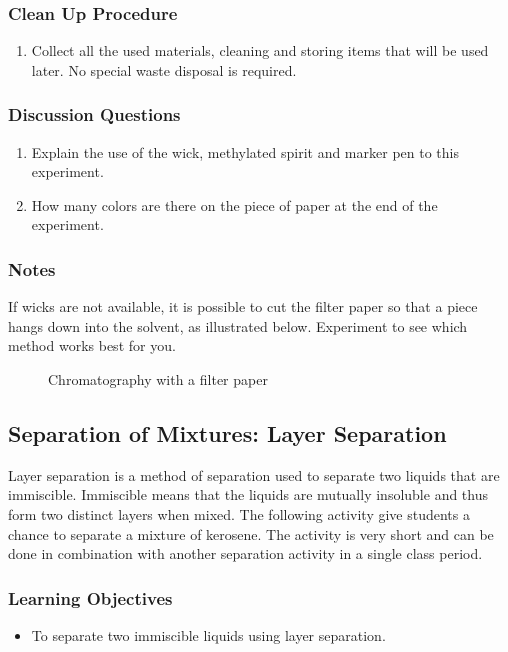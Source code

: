 \subsubsection*{Clean Up Procedure}
\begin{enumerate}
\item{Collect all the used materials, cleaning and storing items that will be used later. No special waste disposal is required.}
\end{enumerate}

\subsubsection*{Discussion Questions}
\begin{enumerate}
\item{Explain the use of the wick, methylated spirit and marker pen to this experiment.}
\item{How many colors are there on the piece of paper at the end of the experiment.}
\end{enumerate}

\subsubsection*{Notes}
If wicks are not available, it is possible to cut the filter paper so that a piece hangs down into the solvent, as illustrated below. Experiment to see which method works best for you.

\begin{figure}[h]
\begin{center}
\def\svgwidth{250pt}

\caption{Chromatography with a filter paper}
\end{center}
\end{figure}

\subsection{Separation of Mixtures: Layer Separation}
Layer separation is a method of separation used to separate two liquids that are immiscible. Immiscible means that the liquids are mutually insoluble and thus form two distinct layers when mixed. The following activity give students a chance to separate a mixture of kerosene. The activity is very short and can be done in combination with another separation activity in a single class period.

\subsubsection*{Learning Objectives}
\begin{itemize}
\item{To separate two immiscible liquids using layer separation.}
\end{itemize}


